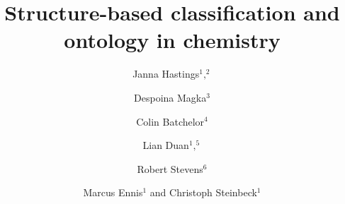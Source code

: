 \documentclass[10pt]{bmc_article}
\newenvironment{bmcformat}{\baselineskip20pt\sloppy\setboolean{publ}{false}}{\baselineskip20pt\sloppy}
\begin{document}
\begin{bmcformat}
 
 


\title{Structure-based classification and ontology in chemistry}
 


\author{Janna Hastings\correspondingauthor$^1,^2$%
       \and 
         Despoina Magka$^3$%
       \and
	     	 Colin Batchelor$^4$  %
       \and 
         Lian Duan$^1,^5$%
       \and 
         Robert Stevens$^6$  %
       \and 
         Marcus Ennis$^1$ %
       and 
       	 Christoph Steinbeck$^1$%
      }
      


\address{%
    \iid(1)Cheminformatics and Metabolism, European Bioinformatics Institute, Hinxton, UK\\
    \iid(2)Swiss Center for Affective Sciences, University of Geneva, Switzerland\\
    \iid(3)Department of Computer Science, University of Oxford, UK\\
    \iid(4)Royal Society of Chemistry, Cambridge, UK\\
    \iid(5)ETH, Z\"{u}rich, Switzerland\\
    \iid(5)Manchester University, UK%
}%


\end{bmcformat}
\end{document}
